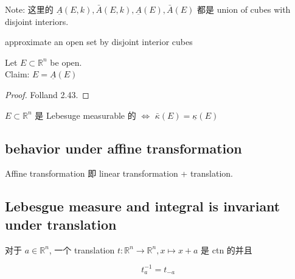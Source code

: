 \documentclass{qlnotes-export}
\begin{document}
Note: 这里的 \(\underset{¯}{A}(E,k),\bar{A}(E,k),\underset{¯}{A}(E),\bar{A}(E)\) 都是 union of cubes with disjoint interiors.

\begin{lemma}{approximate an open set by disjoint interior cubes}\label{lem-07-lebesgue-measure-on-r-n-approximate-an-open-set-by-disjoint-interior-cubes}

Let \(E \subset {\mathbb{R}}^{n}\) be open.\\
Claim: \(E = \underset{¯}{A}(E)\)

\end{lemma}

\begin{proof}

Folland 2.43.

\end{proof}

\begin{corollary}\label{cor-07-lebesgue-measure-on-r-n-corollary-002}

\(E \subset {\mathbb{R}}^{n}\) 是 Lebesuge measurable 的 \(\Leftrightarrow\) \(\bar{\kappa}(E) = \underset{¯}{\kappa}(E)\)

\end{corollary}

\subsection{behavior under affine transformation}\label{behavior-under-affine-transformation}

Affine transformation 即 linear transformation + translation.

\subsection{Lebesgue measure and integral is invariant under translation}\label{lebesgue-measure-and-integral-is-invariant-under-translation}

对于 \(a \in {\mathbb{R}}^{n}\), 一个 translation \(t:{\mathbb{R}}^{n}\rightarrow{\mathbb{R}}^{n},x\mapsto x + a\) 是 ctn 的并且

\[t_{a}^{- 1} = t_{- a}\]
\end{document}
